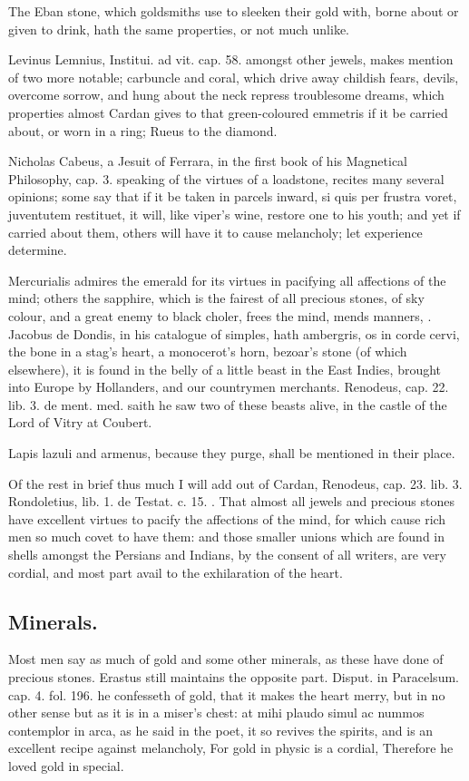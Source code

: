 {The Eban stone, which goldsmiths use to sleeken their gold with, borne
about or given to drink, hath the same properties, or not much
unlike.

Levinus Lemnius, Institui. ad vit. cap. 58. amongst other jewels, makes
mention of two more notable; carbuncle and coral, which drive
away childish fears, devils, overcome sorrow, and hung about the neck
repress troublesome dreams, which properties almost Cardan gives to
that green-coloured emmetris if it be carried about, or worn in a
ring; Rueus to the diamond.

Nicholas Cabeus, a Jesuit of Ferrara, in the first book of his
Magnetical Philosophy, cap. 3. speaking of the virtues of a loadstone,
recites many several opinions; some say that if it be taken in parcels
inward, si quis per frustra voret, juventutem restituet, it will, like
viper's wine, restore one to his youth; and yet if carried about them,
others will have it to cause melancholy; let experience determine.

Mercurialis admires the emerald for its virtues in pacifying all
affections of the mind; others the sapphire, which is the fairest
of all precious stones, of sky colour, and a great enemy to black
choler, frees the mind, mends manners, \etc{}. Jacobus de Dondis, in his
catalogue of simples, hath ambergris, os in corde cervi, the bone
in a stag's heart, a monocerot's horn, bezoar's stone (of which
elsewhere), it is found in the belly of a little beast in the East
Indies, brought into Europe by Hollanders, and our countrymen
merchants. Renodeus, cap. 22. lib. 3. de ment. med. saith he saw two of
these beasts alive, in the castle of the Lord of Vitry at Coubert.

Lapis lazuli and armenus, because they purge, shall be mentioned in
their place.

Of the rest in brief thus much I will add out of Cardan, Renodeus, cap.
23. lib. 3. Rondoletius, lib. 1. de Testat. c. 15. \etc{}. That
almost all jewels and precious stones have excellent virtues to pacify
the affections of the mind, for which cause rich men so much covet to
have them: and those smaller unions which are found in shells
amongst the Persians and Indians, by the consent of all writers, are
very cordial, and most part avail to the exhilaration of the heart.

\subsection{Minerals.}
Most men say as much of gold and some other minerals, as
these have done of precious stones. Erastus still maintains the
opposite part. Disput. in Paracelsum. cap. 4. fol. 196. he confesseth
of gold,  that it makes the heart merry, but in no other sense
but as it is in a miser's chest: at mihi plaudo simul ac nummos
contemplor in arca, as he said in the poet, it so revives the spirits,
and is an excellent recipe against melancholy,
For gold in physic is a cordial,
Therefore he loved gold in special.

}

